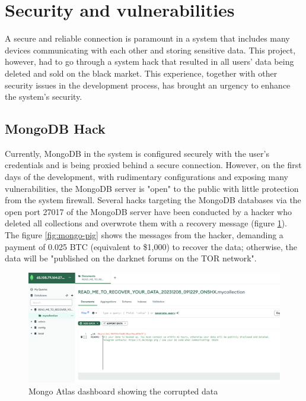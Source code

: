 \documentclass[../Main.tex]{subfiles}
\begin{document}
\section{Security and vulnerabilities}
A secure and reliable connection is paramount in a system that includes many devices communicating with each other and storing sensitive data. This project, however, had to go through a system hack that resulted in all users' data being deleted and sold on the black market. This experience, together with other security issues in the development process, has brought an urgency to enhance the system's security.
\subsection{MongoDB Hack}
Currently, MongoDB in the system is configured securely with the user's credentials and is being proxied behind a secure connection. However, on the first days of the development, with rudimentary configurations and exposing many vulnerabilities, the MongoDB server is "open" to the public with little protection from the system firewall. Several hacks targeting the MongoDB databases via the open port 27017 of the MongoDB server have been conducted by a hacker who deleted all collections and overwrote them with a recovery message (figure \ref{fig:atlas-hack}). The figure \ref{fig:mongo-pig} shows the messages from the hacker, demanding a payment of 0.025 BTC (equivalent to \$1,000) to recover the data; otherwise, the data will be "published on the darknet forums on the TOR network".
\begin{figure}[H]
    \centering
    \includegraphics[width=0.9\linewidth]{doc/imgs/mongo-hack.png}
    \caption{Mongo Atlas dashboard showing the corrupted data}
    \label{fig:atlas-hack}
\end{figure}
\end{document}
